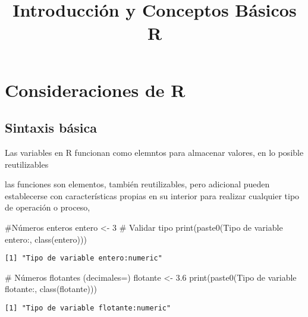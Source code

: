 \documentclass[
  letterpaper,
  DIV=11,
  numbers=noendperiod]{scrartcl}
\title{Introducción y Conceptos Básicos R}
\author{}
\date{}
\newenvironment{Shaded}{\begin{snugshade}}{\end{snugshade}}
\newcommand{\CommentTok}[1]{\textcolor[rgb]{0.37,0.37,0.37}{#1}}
\newcommand{\DecValTok}[1]{\textcolor[rgb]{0.68,0.00,0.00}{#1}}
\newcommand{\FloatTok}[1]{\textcolor[rgb]{0.68,0.00,0.00}{#1}}
\newcommand{\FunctionTok}[1]{\textcolor[rgb]{0.28,0.35,0.67}{#1}}
\newcommand{\NormalTok}[1]{\textcolor[rgb]{0.00,0.23,0.31}{#1}}
\newcommand{\OtherTok}[1]{\textcolor[rgb]{0.00,0.23,0.31}{#1}}
\newcommand{\StringTok}[1]{\textcolor[rgb]{0.13,0.47,0.30}{#1}}
\begin{document}
\maketitle


\section{Consideraciones de R}\label{consideraciones-de-r}

\subsection{Sintaxis básica}\label{sintaxis-buxe1sica}

Las variables en R funcionan como elemntos para almacenar valores, en lo
posible reutilizables

las funciones son elementos, también reutilizables, pero adicional
pueden establecerse con características propias en su interior para
realizar cualquier tipo de operación o proceso,

\begin{Shaded}
\begin{Highlighting}[]
\CommentTok{\#Números enteros}
\NormalTok{entero }\OtherTok{\textless{}{-}} \DecValTok{3}
\CommentTok{\# Validar tipo}
\FunctionTok{print}\NormalTok{(}\FunctionTok{paste0}\NormalTok{(}\StringTok{\textquotesingle{}Tipo de variable entero:\textquotesingle{}}\NormalTok{, }\FunctionTok{class}\NormalTok{(entero)))}
\end{Highlighting}
\end{Shaded}

\begin{verbatim}
[1] "Tipo de variable entero:numeric"
\end{verbatim}

\begin{Shaded}
\begin{Highlighting}[]
\CommentTok{\# Números flotantes (decimales=)}
\NormalTok{flotante }\OtherTok{\textless{}{-}} \FloatTok{3.6}
\FunctionTok{print}\NormalTok{(}\FunctionTok{paste0}\NormalTok{(}\StringTok{\textquotesingle{}Tipo de variable flotante:\textquotesingle{}}\NormalTok{, }\FunctionTok{class}\NormalTok{(flotante)))}
\end{Highlighting}
\end{Shaded}

\begin{verbatim}
[1] "Tipo de variable flotante:numeric"
\end{verbatim}
\end{document}
